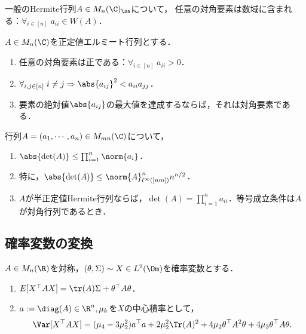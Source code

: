 \documentclass[uplatex, dvipdfmx]{jsreport}
\begin{document}
\begin{theorem}
    一般のHermite行列$A\in M_n(\C)_\sa$について，
    任意の対角要素は数域に含まれる：$\forall_{i\in[n]}\;a_{ii}\in W(A)$．
\end{theorem}

\begin{proposition}
    $A\in M_n(\C)$を正定値エルミート行列とする．
    \begin{enumerate}
        \item 任意の対角要素は正である：$\forall_{i\in[n]}\;a_{ii}>0$．
        \item $\forall_{i,j\in[n]}\;i\ne j\Rightarrow\abs{a_{ij}}^2<a_{ii}a_{jj}$．
        \item 要素の絶対値$\abs{a_{ij}}$の最大値を達成するならば，それは対角要素である．
    \end{enumerate}
\end{proposition}

\begin{proposition}[Hadamard]
    行列$A=(a_1,\cdots,a_n)\in M_{mn}(\C)$について，
    \begin{enumerate}
        \item $\abs{\det(A)}\le\prod_{i=1}^n\norm{a_i}$．
        \item 特に，$\abs{\det(A)}\le\norm{A}_{l^\infty([nm])}^nn^{n/2}$．
        \item $A$が半正定値Hermite行列ならば，$\det(A)=\prod_{i=1}^na_{ii}$．等号成立条件は$A$が対角行列であるとき．
    \end{enumerate}
\end{proposition}

\subsection{確率変数の変換}

\begin{proposition}[平均と分散]
    $A\in M_n(\R)$を対称，$(\theta,\Sigma)\sim X\in L^2(\Om)$を確率変数とする．
    \begin{enumerate}
        \item $E[X^\top AX]=\tr(A)\Sigma+\theta^\top A\theta$．
        \item $a:=\diag(A)\in\R^n,\mu_k$を$X$の中心積率として，
        \[\Var[X^\top AX]=(\mu_4-3\mu_2^2)a^\top a+2\mu_2^2\Tr(A)^2+4\mu_2\theta^\top A^2\theta+4\mu_3\theta^\top A\theta.\]
    \end{enumerate}
\end{proposition}
\end{document}
